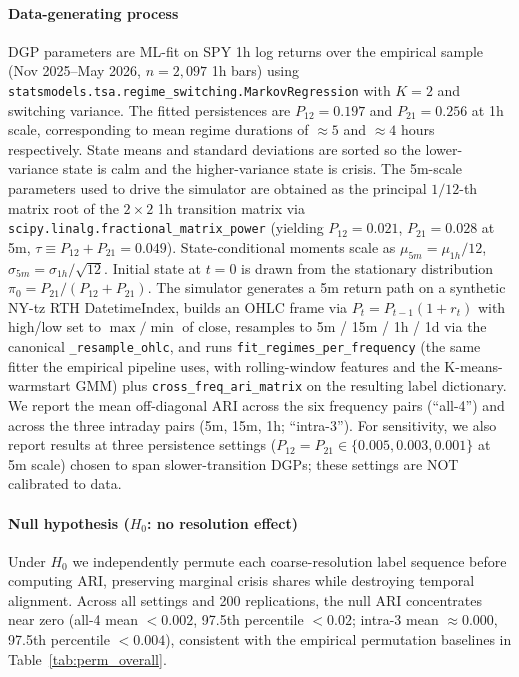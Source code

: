 \documentclass[preprint,12pt,authoryear]{elsarticle}
\begin{document}
\paragraph{Data-generating process}
DGP parameters are ML-fit on SPY 1h log returns over the empirical sample (Nov 2025--May 2026, $n=2{,}097$ 1h bars) using \texttt{statsmodels.tsa.regime\_switching.MarkovRegression} with $K=2$ and switching variance. The fitted persistences are $P_{12}=0.197$ and $P_{21}=0.256$ at 1h scale, corresponding to mean regime durations of $\approx 5$ and $\approx 4$ hours respectively. State means and standard deviations are sorted so the lower-variance state is calm and the higher-variance state is crisis. The 5m-scale parameters used to drive the simulator are obtained as the principal $1/12$-th matrix root of the $2\times 2$ 1h transition matrix via \texttt{scipy.linalg.fractional\_matrix\_power} (yielding $P_{12}=0.021$, $P_{21}=0.028$ at 5m, $\tau \equiv P_{12}+P_{21} = 0.049$). State-conditional moments scale as $\mu_{5m} = \mu_{1h}/12$, $\sigma_{5m} = \sigma_{1h}/\sqrt{12}$. Initial state at $t=0$ is drawn from the stationary distribution $\pi_0 = P_{21}/(P_{12}+P_{21})$. The simulator generates a 5m return path on a synthetic NY-tz RTH DatetimeIndex, builds an OHLC frame via $P_t = P_{t-1}(1+r_t)$ with high/low set to $\max/\min$ of close, resamples to 5m / 15m / 1h / 1d via the canonical \texttt{\_resample\_ohlc}, and runs \texttt{fit\_regimes\_per\_frequency} (the same fitter the empirical pipeline uses, with rolling-window features and the K-means-warmstart GMM) plus \texttt{cross\_freq\_ari\_matrix} on the resulting label dictionary. We report the mean off-diagonal ARI across the six frequency pairs (``all-4'') and across the three intraday pairs (5m, 15m, 1h; ``intra-3''). For sensitivity, we also report results at three persistence settings ($P_{12}=P_{21} \in \{0.005, 0.003, 0.001\}$ at 5m scale) chosen to span slower-transition DGPs; these settings are NOT calibrated to data.

\paragraph{Null hypothesis ($H_0$: no resolution effect)}
Under $H_0$ we independently permute each coarse-resolution label sequence before computing ARI, preserving marginal crisis shares while destroying temporal alignment. Across all settings and 200 replications, the null ARI concentrates near zero (all-4 mean $< 0.002$, 97.5th percentile $< 0.02$; intra-3 mean $\approx 0.000$, 97.5th percentile $< 0.004$), consistent with the empirical permutation baselines in Table~\ref{tab:perm_overall}.
\end{document}
